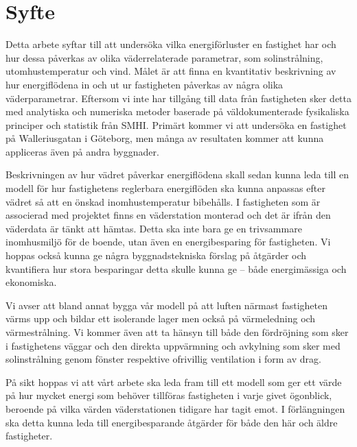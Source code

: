 \section{Syfte}
Detta arbete syftar till att undersöka vilka energiförluster en fastighet har och hur dessa 
påverkas av olika väderrelaterade parametrar, som solinstrålning, utomhustemperatur 
och vind. Målet är att finna en kvantitativ beskrivning av hur energiflödena in och ut ur 
fastigheten påverkas av några olika väderparametrar. Eftersom vi inte har tillgång till data
 från fastigheten sker detta med analytiska och numeriska metoder baserade på 
väldokumenterade fysikaliska principer och statistik från SMHI. Primärt kommer vi att 
undersöka en fastighet på Walleriusgatan i Göteborg, men många av resultaten kommer 
att kunna appliceras även på andra byggnader.

Beskrivningen av hur vädret påverkar energiflödena skall sedan kunna leda till en modell 
för hur fastighetens reglerbara energiflöden ska kunna anpassas efter vädret så att en 
önskad inomhustemperatur bibehålls. I fastigheten som är associerad med projektet finns
 en väderstation monterad och det är ifrån den väderdata är tänkt att hämtas. Detta ska 
 inte bara ge en trivsammare inomhusmiljö för de boende, utan även en energibesparing 
 för fastigheten. Vi hoppas också kunna ge några byggnadstekniska förslag på åtgärder 
 och kvantifiera hur stora besparingar detta skulle kunna ge – både energimässiga och 
 ekonomiska.

Vi avser att bland annat bygga vår modell på att luften närmast fastigheten värms upp och 
bildar ett isolerande lager men också på värmeledning och värmestrålning. Vi kommer 
även att ta hänsyn till både den fördröjning som 
sker i fastighetens väggar och den direkta uppvärmning och avkylning som sker med 
solinstrålning genom fönster respektive ofrivillig ventilation i form av drag.

På sikt hoppas vi att vårt arbete ska leda fram till ett modell som ger ett värde på hur mycket energi som behöver tillföras fastigheten i varje givet ögonblick, beroende på vilka värden väderstationen tidigare har tagit emot. I förlängningen ska detta kunna leda till energibesparande åtgärder för både den här och äldre fastigheter.
